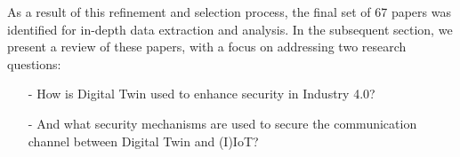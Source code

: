 As a result of this refinement and selection process, the final set of 67 papers was identified for in-depth data extraction and analysis. In the subsequent section, we present a review of these papers, with a focus on addressing two research questions:\begin{itemize}
    \item[-] How is Digital Twin used to enhance security in Industry 4.0?
    \item[-] And what security mechanisms are used to secure the communication channel between Digital Twin and (I)IoT? 
\end{itemize} 

 




